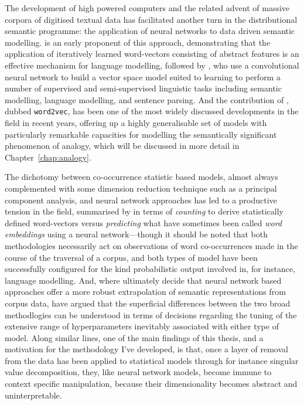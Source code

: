 The development of high powered computers and the related advent of massive corpora of digitised textual data has facilitated another turn in the distributional semantic programme: the application of neural networks to data driven semantic modelling.  \cite{BengioEA2003} is an early proponent of this approach, demonstrating that the application of iteratively learned word-vectors consisting of abstract features is an effective mechanism for language modelling, followed by \cite{CollobertEA2008}, who use a convolutional neural network to build a vector space model suited to learning to perform a number of supervised and semi-supervised linguistic tasks including semantic modelling, language modelling, and sentence parsing.  And the contribution of \cite{MikolovEA2013}, dubbed \texttt{word2vec}, has been one of the most widely discussed developments in the field in recent years, offering up a highly generalisable set of models with particularly remarkable capacities for modelling the semantically significant phenomenon of analogy, which will be discussed in more detail in Chapter~\ref{chap:analogy}.

The dichotomy between co-occurrence statistic based models, almost always complemented with some dimension reduction technique such as a principal component analysis, and neural network approaches has led to a productive tension in the field, summarised by  in terms of \emph{counting} to derive statistically defined word-vectors versus \emph{predicting} what have sometimes been called \emph{word embeddings} using a neural network---though it should be noted that both methodologies necessarily act on observations of word co-occurrences made in the course of the traversal of a corpus, and both types of model have been successfully configured for the kind probabilistic output involved in, for instance, language modelling.  And, where \citeauthor{BaroniEA2014} ultimately decide that neural network based approaches offer a more robust extrapolation of semantic representations from corpus data, \cite{LevyEA2014b} have argued that the superficial differences between the two broad methodlogies can be understood in terms of decisions regarding the tuning of the extensive range of hyperparameters inevitably associated with either type of model.  Along similar lines, one of the main findings of this thesis, and a motivation for the methodology I've developed, is that, once a layer of removal from the data has been applied to statistical models through for instance singular value decomposition, they, like neural network models, become immune to context specific manipulation, because their dimensionality becomes abstract and uninterpretable.

